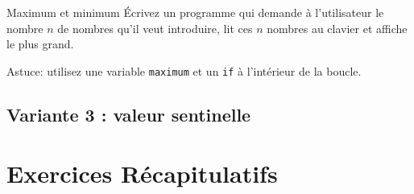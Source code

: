 \documentclass[a4paper,11pt]{article}
\begin{document}
		\begin{Exercice}{Maximum et minimum}
			\'Ecrivez un programme qui demande à l'utilisateur le nombre $n$ de nombres qu'il veut introduire,
			lit ces $n$ nombres au clavier et affiche le plus grand. 
		
			Astuce: utilisez une variable \texttt{maximum} et un \texttt{if} à l'intérieur de la boucle.
		\end{Exercice}


		\begin{Exercice}{}
		
		\end{Exercice}


	\subsection{Variante 3 : valeur sentinelle}
	

		\begin{Exercice}{}
		
		\end{Exercice}

		\begin{Exercice}{}
		
		\end{Exercice}


\section{Exercices Récapitulatifs}
\end{document}
